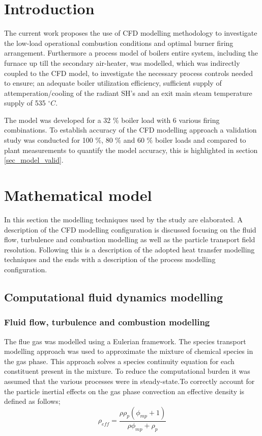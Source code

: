 \documentclass[review]{elsarticle}
\begin{document}
\section{Introduction}


The current work proposes the use of CFD modelling methodology to investigate the low-load operational combustion conditions and optimal burner firing arrangement. Furthermore a process model of boilers entire system, including the furnace up till the secondary air-heater, was modelled, which was indirectly coupled to the CFD model, to investigate the necessary process controls needed to ensure; an adequate boiler utilization efficiency, sufficient supply of attemperation/cooling of the radiant SH's and an exit main steam temperature supply of 535 $^\circ C$. 

The model was developed for a 32 $\%$ boiler load with 6 various firing combinations. To establish accuracy of the CFD modelling approach a validation study was conducted for 100 $\%$, 80 $\%$ and 60 $\%$ boiler loads and compared to plant measurements to quantify the model accuracy, this is highlighted in section \ref{sec_model_valid}. 

\section{Mathematical model}
In this section the modelling techniques used by the study are elaborated. A description of the CFD modelling configuration is discussed focusing on the fluid flow, turbulence and combustion modelling as well as the particle transport field resolution. Following this is a description of the adopted heat transfer modelling techniques and the ends with a description of the process modelling configuration.
\subsection{Computational fluid dynamics modelling}

\subsubsection{Fluid flow, turbulence and combustion modelling}
The flue gas was modelled using a Eulerian framework. The species transport modelling approach was used to approximate the mixture of chemical species in the gas phase. This approach solves a species continuity equation for each constituent present in the mixture. To reduce the computational burden it was assumed that the various processes were in steady-state.To correctly account for the particle inertial effects on the gas phase convection an effective density is defined as follows;
\begin{equation} \label{eqn_eff_rho}
	\rho_{eff} = \frac{\rho \rho_p \left( \phi_{mp} + 1 \right)}{\rho \phi_{mp} + \rho_p}
\end{equation}
\end{document}
